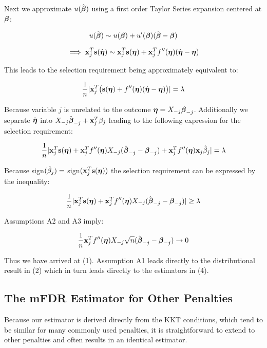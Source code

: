 Next we approximate $u(\hat{\boldsymbol{\beta}})$ using a first order Taylor Series expansion centered at $\boldsymbol{\beta}$:

\begin{equation*}
u(\hat{\boldsymbol{\beta}}) \sim u(\boldsymbol{\beta}) + u'(\boldsymbol{\beta})( \hat{\boldsymbol{\beta}} - \boldsymbol{\beta}) 
\end{equation*}

\begin{equation*}
\implies \mathbf{x}_j^T \mathbf{s}(\hat{\boldsymbol{\eta}}) \sim \mathbf{x}_j^T \mathbf{s}(\boldsymbol{\eta}) +  \mathbf{x}_j^T f''(\boldsymbol{\eta}) ( \hat{\boldsymbol{\eta}} - \boldsymbol{\eta})
\end{equation*}

This leads to the selection requirement being approximately equivalent to:

\begin{equation*}
\frac{1}{n}|\mathbf{x}_j^T \big( \mathbf{s}(\boldsymbol{\eta}) + f''(\boldsymbol{\eta}) (\hat{\boldsymbol{\eta}} - \boldsymbol{\eta})  \big) | = \lambda
\end{equation*}

Because variable $j$ is unrelated to the outcome $\boldsymbol{\eta}= X_{-j}\boldsymbol{\beta}_{-j}$.  Additionally we separate $\hat{\boldsymbol{\eta}}$ into $X_{-j}\hat{\boldsymbol{\beta}}_{-j} + \mathbf{x}_j^T\beta_j$ leading to the following expression for the selection requirement:

\begin{equation*}
\frac{1}{n}|\mathbf{x}_j^T \mathbf{s}(\boldsymbol{\eta}) + \mathbf{x}_j^T f''(\boldsymbol{\eta})X_{-j}(\hat{\boldsymbol{\beta}}_{-j} -  \boldsymbol{\beta}_{-j}) + \mathbf{x}_j^T f''(\boldsymbol{\eta})\mathbf{x}_j \hat{\beta}_j |  = \lambda
\end{equation*}

Because sign$(\hat{\beta}_j) =$ sign$(\mathbf{x}_j^T \mathbf{s}(\boldsymbol{\eta}))$ the selection requirement can be expressed by the inequality:

\begin{equation*}
\frac{1}{n}|\mathbf{x}_j^T  \mathbf{s}(\boldsymbol{\eta}) + \mathbf{x}_j^T f''(\boldsymbol{\eta})X_{-j}(\hat{\boldsymbol{\beta}}_{-j} -  \boldsymbol{\beta}_{-j}) |  \geq \lambda
\end{equation*}

Assumptions A2 and A3 imply:

\begin{equation*}
\frac{1}{n}\mathbf{x}_j^T f''(\boldsymbol{\eta})X_{-j}\sqrt{n}(\hat{\boldsymbol{\beta}}_{-j} -  \boldsymbol{\beta}_{-j})  \rightarrow 0
\end{equation*}

Thus we have arrived at (1).  Assumption A1 leads directly to the distributional result in (2) which in turn leads directly to the estimators in (4). 

\subsection{The mFDR Estimator for Other Penalties}

Because our estimator is derived directly from the KKT conditions, which tend to be similar for many commonly used penalties, it is straightforward to extend to other penalties and often results in an identical estimator.


